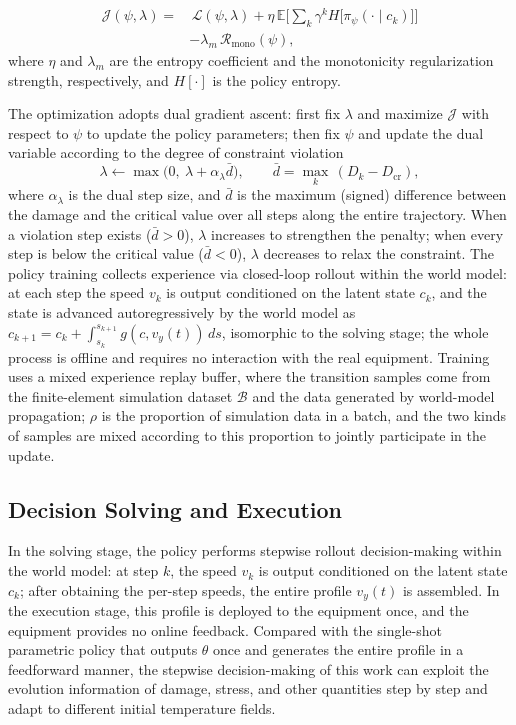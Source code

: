 \begin{equation}
\begin{aligned}
\mathcal{J}(\psi,\lambda)=&\,\mathcal{L}(\psi,\lambda)+\eta\,\mathbb{E}\Big[\sum_{k}\gamma^{k}H\big[\pi_{\psi}(\cdot\mid c_k)\big]\Big]\\
&-\lambda_m\,\mathcal{R}_{\text{mono}}(\psi),
\end{aligned}
\end{equation}
where $\eta$ and $\lambda_m$ are the entropy coefficient and the monotonicity regularization strength, respectively, and $H[\cdot]$ is the policy entropy.

The optimization adopts dual gradient ascent: first fix $\lambda$ and maximize $\mathcal{J}$ with respect to $\psi$ to update the policy parameters; then fix $\psi$ and update the dual variable according to the degree of constraint violation
\begin{equation}
\lambda\leftarrow\max\big(0,\ \lambda+\alpha_{\lambda}\bar{d}\big),\qquad \bar{d}=\max_{k}\,(D_k-D_{\text{cr}}),
\end{equation}
where $\alpha_{\lambda}$ is the dual step size, and $\bar{d}$ is the maximum (signed) difference between the damage and the critical value over all steps along the entire trajectory. When a violation step exists ($\bar{d}>0$), $\lambda$ increases to strengthen the penalty; when every step is below the critical value ($\bar{d}<0$), $\lambda$ decreases to relax the constraint. The policy training collects experience via closed-loop rollout within the world model: at each step the speed $v_k$ is output conditioned on the latent state $c_k$, and the state is advanced autoregressively by the world model as $c_{k+1}=c_k+\int_{s_k}^{s_{k+1}}g(c,v_y(t))\,ds$, isomorphic to the solving stage; the whole process is offline and requires no interaction with the real equipment. Training uses a mixed experience replay buffer, where the transition samples come from the finite-element simulation dataset $\mathcal{B}$ and the data generated by world-model propagation; $\rho$ is the proportion of simulation data in a batch, and the two kinds of samples are mixed according to this proportion to jointly participate in the update.

\subsection{Decision Solving and Execution}
In the solving stage, the policy performs stepwise rollout decision-making within the world model: at step $k$, the speed $v_k$ is output conditioned on the latent state $c_k$; after obtaining the per-step speeds, the entire profile $v_y(t)$ is assembled. In the execution stage, this profile is deployed to the equipment once, and the equipment provides no online feedback. Compared with the single-shot parametric policy that outputs $\theta$ once and generates the entire profile in a feedforward manner, the stepwise decision-making of this work can exploit the evolution information of damage, stress, and other quantities step by step and adapt to different initial temperature fields.
